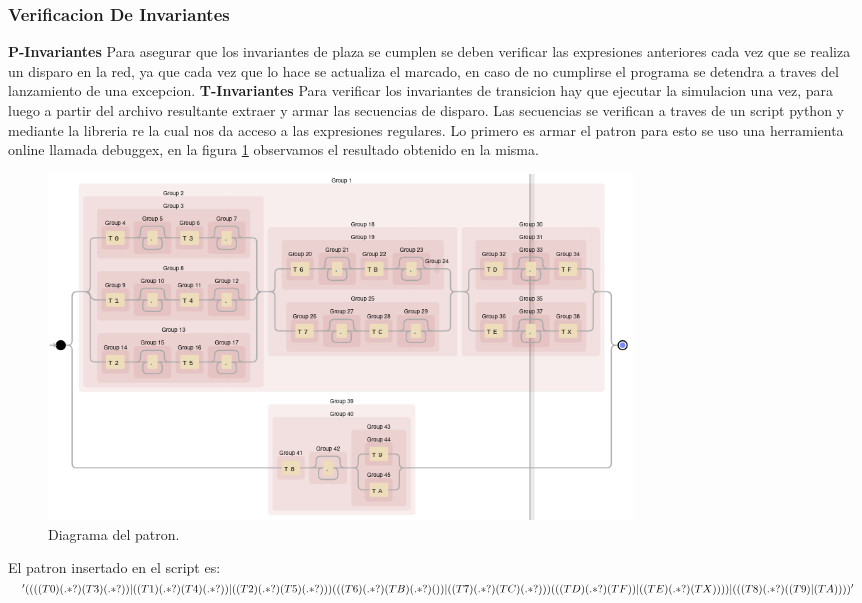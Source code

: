 \documentclass{article}
\begin{document}
		\subsubsection{Verificacion De Invariantes}
		\textbf{P-Invariantes} \newline
		Para asegurar que los invariantes de plaza se cumplen se deben verificar las 
		expresiones anteriores cada vez que se realiza un disparo en la red, ya que 
		cada vez que lo hace se actualiza el marcado, en caso de no cumplirse el programa
		se detendra a traves del lanzamiento de una excepcion.\newline
		\textbf{T-Invariantes} \newline
		Para verificar los invariantes de transicion hay que ejecutar la simulacion una vez, 
		para luego a partir del archivo resultante extraer y armar las secuencias de disparo.
		Las secuencias se verifican a traves de un script python y mediante la libreria re la cual nos da acceso a las expresiones regulares. Lo primero es armar el patron para esto se uso una herramienta online llamada debuggex, en la figura \ref{fig:mesh4} observamos el resultado obtenido en la misma.		 
		\begin{figure}[H]
			\centering
			\includegraphics[width=0.75\textwidth]{debuggex}
			\caption{Diagrama del patron.}
			\label{fig:mesh4}
		\end{figure}
		El patron insertado en el script es:
		\newline
		$'((((T0)(.*?)(T3)(.*?))|((T1)(.*?)(T4)(.*?))|((T2)(.*?)(T5)(.*?)))(((T6)(.*?)(TB)(.*?)())|\\
		((T7)(.*?)(TC)(.*?)))(((TD)(.*?)(TF))|((TE)(.*?)(TX))))|(((T8)(.*?)((T9)|(TA))))'$
\end{document}
